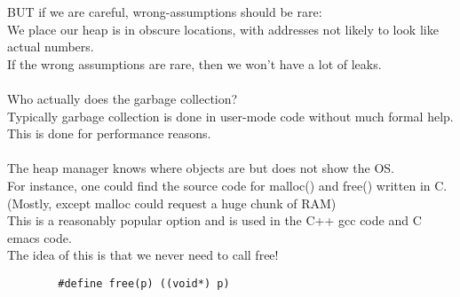 \documentclass[../../lecture_notes.tex]{subfiles}
\begin{document}
\noindent BUT if we are careful, wrong-assumptions should be rare:\\
\indent We place our heap is in obscure locations, with addresses not likely to look like actual numbers.\\
If the wrong assumptions are rare, then we won’t have a lot of leaks.\\
\\
Who actually does the garbage collection?\\
\indent Typically garbage collection is done in user-mode code without much formal help.\\
This is done for performance reasons.\\
\\
The heap manager knows where objects are but does not show the OS.\\
For instance, one could find the source code for malloc() and free() written in C.\\
\indent (Mostly, except malloc could request a huge chunk of RAM)\\
This is a reasonably popular option and is used in the C++ gcc code and C emacs code.\\
The idea of this is that we never need to call free!
\begin{lstlisting}
		#define free(p) ((void*) p)
\end{lstlisting}
\end{document}
